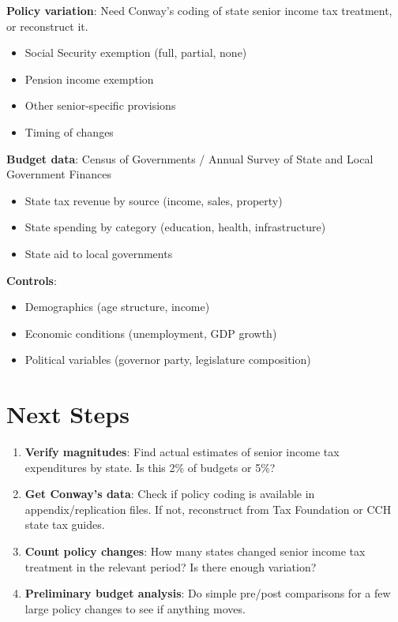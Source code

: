 \documentclass[11pt]{article}
\begin{document}
\textbf{Policy variation}: Need Conway's coding of state senior income tax treatment, or reconstruct it.
\begin{itemize}
    \item Social Security exemption (full, partial, none)
    \item Pension income exemption
    \item Other senior-specific provisions
    \item Timing of changes
\end{itemize}

\textbf{Budget data}: Census of Governments / Annual Survey of State and Local Government Finances
\begin{itemize}
    \item State tax revenue by source (income, sales, property)
    \item State spending by category (education, health, infrastructure)
    \item State aid to local governments
\end{itemize}

\textbf{Controls}:
\begin{itemize}
    \item Demographics (age structure, income)
    \item Economic conditions (unemployment, GDP growth)
    \item Political variables (governor party, legislature composition)
\end{itemize}

\section{Next Steps}

\begin{enumerate}
    \item \textbf{Verify magnitudes}: Find actual estimates of senior income tax expenditures by state. Is this 2\% of budgets or 5\%?
    \item \textbf{Get Conway's data}: Check if policy coding is available in appendix/replication files. If not, reconstruct from Tax Foundation or CCH state tax guides.
    \item \textbf{Count policy changes}: How many states changed senior income tax treatment in the relevant period? Is there enough variation?
    \item \textbf{Preliminary budget analysis}: Do simple pre/post comparisons for a few large policy changes to see if anything moves.
\end{enumerate}
\end{document}
